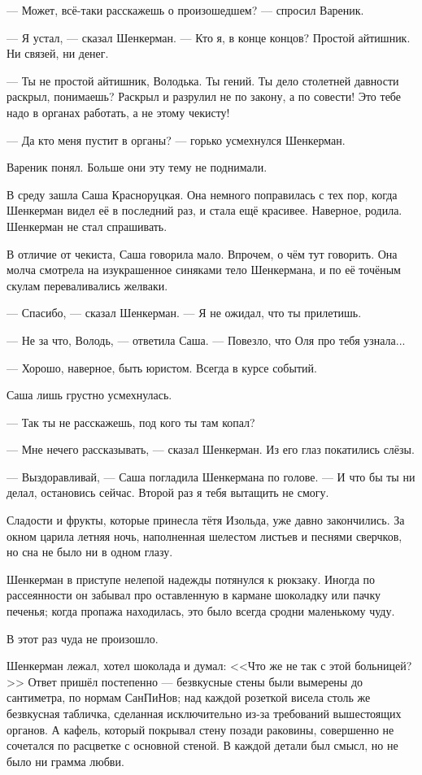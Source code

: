 --- Может, всё-таки расскажешь о произошедшем? --- спросил Вареник.

--- Я устал, --- сказал Шенкерман.
--- Кто я, в конце концов?
Простой айтишник.
Ни связей, ни денег.

--- Ты не простой айтишник, Володька.
Ты гений.
Ты дело столетней давности раскрыл, понимаешь?
Раскрыл и разрулил не по закону, а по совести!
Это тебе надо в органах работать, а не этому чекисту!

--- Да кто меня пустит в органы? --- горько усмехнулся Шенкерман.

Вареник понял.
Больше они эту тему не поднимали.

В среду зашла Саша Красноруцкая.
Она немного поправилась с тех пор, когда Шенкерман видел её в последний раз, и стала ещё красивее.
Наверное, родила.
Шенкерман не стал спрашивать.

В отличие от чекиста, Саша говорила мало.
Впрочем, о чём тут говорить.
Она молча смотрела на изукрашенное синяками тело Шенкермана, и по её точёным скулам переваливались желваки.

--- Спасибо, --- сказал Шенкерман.
--- Я не ожидал, что ты прилетишь.

--- Не за что, Володь, --- ответила Саша.
--- Повезло, что Оля про тебя узнала...

--- Хорошо, наверное, быть юристом.
Всегда в курсе событий.

Саша лишь грустно усмехнулась.

--- Так ты не расскажешь, под кого ты там копал?

--- Мне нечего рассказывать, --- сказал Шенкерман.
Из его глаз покатились слёзы.

--- Выздоравливай, --- Саша погладила Шенкермана по голове.
--- И что бы ты ни делал, остановись сейчас.
Второй раз я тебя вытащить не смогу.

Сладости и фрукты, которые принесла тётя Изольда, уже давно закончились.
За окном царила летняя ночь, наполненная шелестом листьев и песнями сверчков, но сна не было ни в одном глазу.

Шенкерман в приступе нелепой надежды потянулся к рюкзаку.
Иногда по рассеянности он забывал про оставленную в кармане шоколадку или пачку печенья;
когда пропажа находилась, это было всегда сродни маленькому чуду.

В этот раз чуда не произошло.

Шенкерман лежал, хотел шоколада и думал: <<Что же не так с этой больницей?>>
Ответ пришёл постепенно --- безвкусные стены были вымерены до сантиметра, по нормам СанПиНов;
над каждой розеткой висела столь же безвкусная табличка, сделанная исключительно из-за требований вышестоящих органов.
А кафель, который покрывал стену позади раковины, совершенно не сочетался по расцветке с основной стеной.
В каждой детали был смысл, но не было ни грамма любви.

